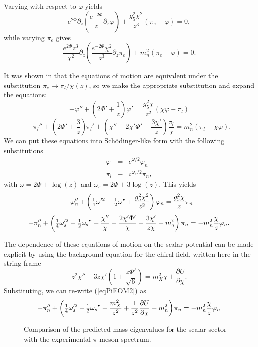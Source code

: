 \documentclass[aps,prd,12pt,nofootinbib]{revtex4}
\newcommand{\be}{\begin{equation}}
\newcommand{\ee}{\end{equation}}
\newcommand{\ba}{\begin{eqnarray}}
\newcommand{\ea}{\end{eqnarray}}
\def\thalf{{\textstyle{\frac{1}{2}}}}
\def\oneqt{{\textstyle{\frac{1}{4}}}}
\def\rt6{\sqrt{6}}
\begin{document}
Varying with respect to $\varphi$ yields
\be
e^{2\Phi} \partial_z \left(\frac{e^{-2\Phi}}{z}\partial_z \varphi \right) + \frac{g_5^2 \chi^2}{z^3}(\pi_e-\varphi)=0,
\ee
while varying $\pi_e$ gives
\be
\frac{e^{2\Phi} z^3}{\chi^2}\partial_z \left(\frac{e^{-2\Phi}\chi^2}{z^3} \partial_z \pi_e \right) +m_n^2(\pi_e-\varphi) = 0.
\ee

It was shown in \cite{bartz-pions} that the equations of motion are equivalent under the substitution $\pi_e \rightarrow \pi_l/\chi(z)$, so we make the appropriate substitution and expand the equations:
\be
- \varphi'' + \left(2\Phi'+\frac{1}{z}\right)\varphi' = \frac{g_5^2 \chi}{z^2}(\chi \varphi -\pi_l)
\ee
\be 
-\pi_l'' + \left(2\Phi'+\frac{3}{z}\right)\pi_l' + \left(\chi''-2\chi' \Phi' - \frac{3 \chi'}{z}\right)\frac{\pi_l}{\chi} = m_n^2 (\pi_l - \chi \varphi).
\ee
We can put these equations into Sch{\"o}dinger-like form with the following substitutions
\ba
\varphi & = & e^{\omega/2}\varphi_n \\
\pi_l & = & e^{\omega_s/2} \pi_n, 
\ea
with $\omega =2 \Phi + \log(z)$ and $\omega_s = 2 \Phi + 3\log(z)$.
This yields 
\be
-\varphi_n''+\left(\oneqt \omega'^2-\thalf \omega" +\frac{g_5^2 \chi^2}{z^2}\right)\varphi_n = \frac{g_5^2 \chi}{z} \pi_n
\ee
\be
-\pi_n''+\left(\oneqt \omega_s'^2-\thalf \omega_s" +\frac{\chi''}{\chi}-\frac{2\chi' \Phi'}{\chi} - \frac{3 \chi'}{z\chi}-m_n^2 \right) \pi_n = -m_n^2 \frac{\chi}{z}\varphi_n.
\label{eqPiEOM2}
\ee

The dependence of these equations of motion on the scalar potential can be made explicit by using the background equation for the chiral field, written here in the string frame
\be
z^2\chi'' -3z\chi' \left(1+\frac{z\Phi'}{\rt6} \right) = m_X^2\chi +\frac{\partial U}{\partial \chi}.
\ee
Substituting, we can re-write (\ref{eqPiEOM2}) as
\be
-\pi_n''+\left(\oneqt \omega_s'^2-\thalf \omega_s" +\frac{m_X^2}{z^2}+\frac{1}{z^2} \frac{\partial U}{\partial \chi} -m_n^2 \right) \pi_n = -m_n^2 \frac{\chi}{z}\varphi_n
\ee

\begin{figure}[htb]
\caption{Comparison of the predicted mass eigenvalues for the scalar sector with the experimental $\pi$ meson spectrum.}
\label{figPion}
\end{figure}
\end{document}
